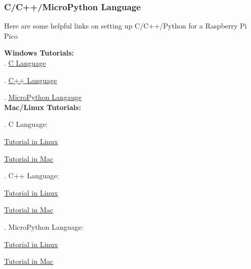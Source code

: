 \documentclass[a4paper,12pt]{article}
\begin{document}
\subsubsection{C/C++/MicroPython Language}\label{cc_lang}

Here are some helpful links on setting up C/C++/Python for a Raspberry Pi Pico

\textbf{Windows Tutorials:}\\
\indent{}. \underline{\href{https://www.raspberrypi.com/news/raspberry-pi-pico-windows-installer/}{C Language}}

\indent{}. \underline{\href{https://www.raspberrypi.com/news/raspberry-pi-pico-windows-installer/}{C++ Language}}

\indent{}. \underline{\href{https://how2electronics.com/raspberry-pi-pico-getting-started-tutorial-with-micropython/}{MicroPython Langauge}}\\

\textbf{Mac/Linux Tutorials:}

\indent{}. C Language:
\begin{description}
	\setlength{\itemindent}{3em}
	\item[$\bullet$] \underline{\href{https://www.electronicshub.org/program-raspberry-pi-pico-using-c/}{Tutorial in Linux}}
	\item[$\bullet$] \underline{\href{https://blog.smittytone.net/2021/02/02/program-raspberry-pi-pico-c-mac/}{Tutorial in Mac}}
\end{description}

\indent{}. C++ Language:
\begin{description}
	\setlength{\itemindent}{3em}
	\item[$\bullet$]\underline{\href{https://circuitdigest.com/microcontroller-projects/how-to-program-raspberry-pi-pico-using-c}{Tutorial in Linux}}
	\item[$\bullet$]\underline{\href{https://www.peterzimon.com/raspberry-pi-pico-mac-c-getting-started/}{Tutorial in Mac}}
\end{description}

\indent{}. MicroPython Language:
\begin{description}
	\setlength{\itemindent}{3em}
	\item[$\bullet$]\underline{\href{https://circuitdigest.com/microcontroller-projects/getting-started-with-raspberry-pi-pico-with-micropython}{Tutorial in Linux}}
	\item[$\bullet$]\underline{\href{https://desertbot.io/blog/raspberry-pi-pico-setup-mac}{Tutorial in Mac}}
\end{description}
\end{document}
